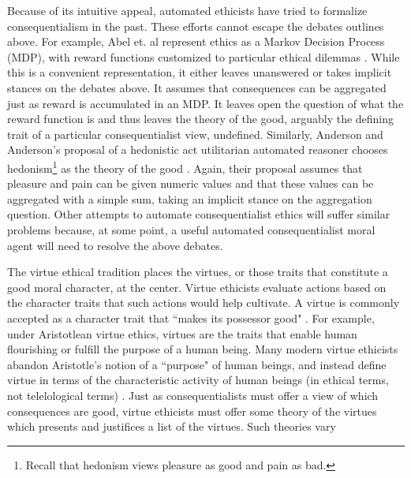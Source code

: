 \begin{isabellebody}
\begin{isamarkuptext}
Because of its intuitive appeal, automated ethicists have tried to formalize consequentialism in the past.
These efforts cannot escape the debates outlines above. For example, Abel et. al represent ethics as a
Markov Decision Process (MDP), with reward functions customized to particular ethical dilemmas 
\cite[3]{util1}. While this is a convenient representation, it either leaves unanswered or 
takes implicit stances on the debates above. It assumes that consequences can be aggregated just as 
reward is accumulated in an MDP. It leaves open the question of what the reward function is and thus 
leaves the theory of the good, arguably the defining trait of a particular consequentialist view, 
undefined. Similarly, Anderson and Anderson's proposal of a hedonistic act 
utilitarian automated reasoner chooses hedonism\footnote{Recall that hedonism views pleasure as good
and pain as bad.} as the theory of the good \cite[2]{util2}. Again, their proposal assumes that pleasure and pain can be 
given numeric values and that these values can be aggregated with a simple sum, taking an implicit
stance on the aggregation question. Other attempts to automate consequentialist ethics will suffer 
similar problems because, at some point, a useful automated consequentialist moral agent will need 
to resolve the above debates.%
\end{isamarkuptext}\isamarkuptrue%
%
\isadelimdocument
%
\endisadelimdocument
%
\isatagdocument
%
\isamarkuptrue%
%
\isamarkuptrue%
%
\endisatagdocument
{\isafolddocument}%
%
\isadelimdocument
%
\endisadelimdocument
%
\begin{isamarkuptext}%
The virtue ethical tradition places the virtues, or those traits that constitute a 
good moral character, at the center. Virtue ethicists evaluate actions based on the character traits 
that such actions would help cultivate. A virtue is commonly accepted as a character trait that 
``makes its possessor good" \cite{vesep}. For example, under Aristotlean virtue ethics, virtues 
are the traits that enable human flourishing or fulfill the purpose of a human being. Many modern 
virtue ethicists abandon Aristotle's notion of a ``purpose" of human beings, and instead define virtue 
in terms of the characteristic activity of human beings (in ethical terms, not telelological terms) \cite{snow}. 
Just as consequentialists must offer a view of which consequences are good, virtue ethicists must offer some 
theory of the virtues which presents and justifices a list of the virtues. Such theories vary

\end{isamarkuptext}
\end{isabellebody}
